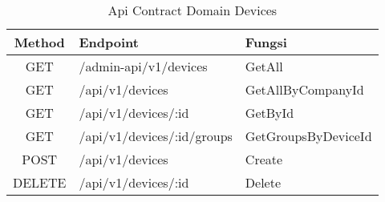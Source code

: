 \bgroup
\begin{table}[htbp]
    \caption{Api Contract Domain Devices}
    \label{tab:api-contract-domain-device}
    \def\arraystretch{1.7}
    \centering
    \begin{tabular}{|c|p{6cm}|p{4cm}|}
        \hline
        Method & Endpoint                   &
        Fungsi                                                    \\
        \hline
        GET    & /admin-api/v1/devices      & GetAll              \\
        \hline
        GET    & /api/v1/devices            & GetAllByCompanyId   \\
        \hline
        GET    & /api/v1/devices/:id        & GetById             \\
        \hline
        GET    & /api/v1/devices/:id/groups & GetGroupsByDeviceId \\
        \hline
        POST   & /api/v1/devices            & Create              \\
        \hline
        DELETE & /api/v1/devices/:id        & Delete              \\
        \hline
    \end{tabular}
\end{table}
\egroup

\pagebreak

